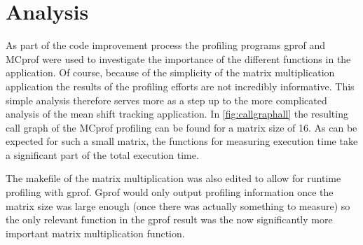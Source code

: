 \documentclass[final]{article}
\begin{document}
\section{Analysis}
As part of the code improvement process the profiling programs gprof and MCprof were used to investigate the importance of the different functions in the application. Of course, because of the simplicity of the matrix multiplication application the results of the profiling efforts are not incredibly informative. This simple analysis therefore serves more as a step up to the more complicated analysis of the mean shift tracking application. In \cref{fig:callgraphall} the resulting call graph of the MCprof profiling can be found for a matrix size of 16. As can be expected for such a small matrix, the functions for measuring execution time take a significant part of the total execution time.

The makefile of the matrix multiplication was also edited to allow for runtime profiling with gprof. Gprof would only output profiling information once the matrix size was large enough (once there was actually something to measure) so the only relevant function in the gprof result was the now significantly more important matrix multiplication function.
\end{document}
